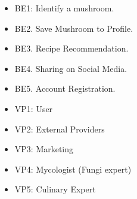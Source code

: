 \documentclass[]{article}
\begin{document}
\begin{itemize}
	\item BE1: Identify a mushroom.
 	\item BE2. Save Mushroom to Profile.
 	\item BE3. Recipe Recommendation.
 	\item BE4. Sharing on Social Media.
 	\item BE5. Account Registration.
\end{itemize}

\newpage
{} 

\begin{itemize}
	\item VP1: User
	\item VP2: External Providers
	\item VP3: Marketing
	\item VP4: Mycologist (Fungi expert)
	\item VP5: Culinary Expert
\end{itemize}
\end{document}
